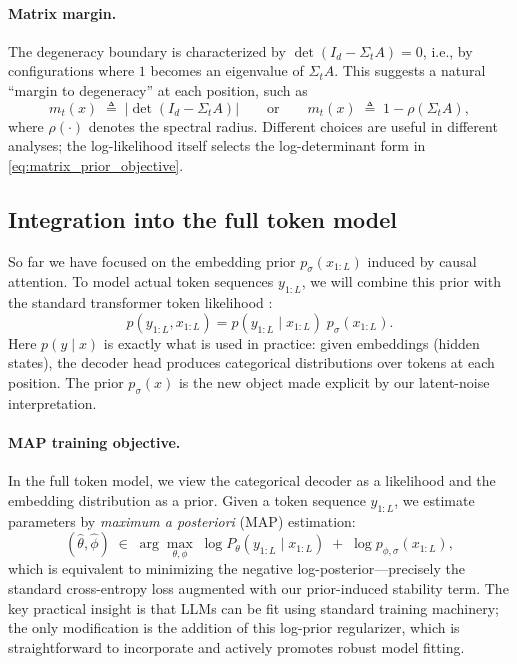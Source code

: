 \documentclass[11pt]{article}
\begin{document}
\paragraph{Matrix margin.}
The degeneracy boundary is characterized by $\det(I_d-\Sigma_tA)=0$,
i.e., by configurations where $1$ becomes an eigenvalue of $\Sigma_tA$.
This suggests a natural ``margin to degeneracy'' at each position, such as
\begin{equation}
m_t(x)\;\triangleq\; \left|\det(I_d-\Sigma_tA)\right|
\qquad\text{or}\qquad
m_t(x)\;\triangleq\; 1-\rho(\Sigma_tA),
\label{eq:matrix_margin_def_options}
\end{equation}
where $\rho(\cdot)$ denotes the spectral radius.
Different choices are useful in different analyses; the log-likelihood itself selects the
log-determinant form in \eqref{eq:matrix_prior_objective}.

\subsection{Integration into the full token model}
\label{subsec:bridge_to_tokens}

So far we have focused on the embedding prior $p_\sigma(x_{1:L})$ induced by causal attention.
To model actual token sequences $y_{1:L}$, we will combine this prior with the standard transformer
token likelihood \citep{VaswaniShPaUsJoGoKaPo17,BrownMaRyEtAl20}:
\begin{equation}
p(y_{1:L},x_{1:L})
=
p(y_{1:L}\mid x_{1:L})\;p_\sigma(x_{1:L}).
\label{eq:joint_y_x_preview}
\end{equation}
Here $p(y\mid x)$ is exactly what is used in practice: given embeddings (hidden states),
the decoder head produces categorical distributions over tokens at each position.
The prior $p_\sigma(x)$ is the new object made explicit by our latent-noise interpretation. 

\paragraph{MAP training objective.}
In the full token model, we view the categorical decoder as a likelihood and the embedding distribution as a prior.
Given a token sequence $y_{1:L}$, we estimate parameters by \emph{maximum a posteriori} (MAP) estimation:
\begin{equation}
(\hat\theta,\hat\phi)
\;\in\;
\arg\max_{\theta,\phi}\;
\log P_\theta(y_{1:L}\mid x_{1:L})
\;+\;
\log p_{\phi,\sigma}(x_{1:L}),
\label{eq:map_training}
\end{equation}
which is equivalent to minimizing the negative log-posterior---precisely the standard cross-entropy loss augmented with our prior-induced stability term. The key practical insight is that LLMs can be fit using standard training machinery; the only modification is the addition of this log-prior regularizer, which is straightforward to incorporate and actively promotes robust model fitting.
\end{document}
